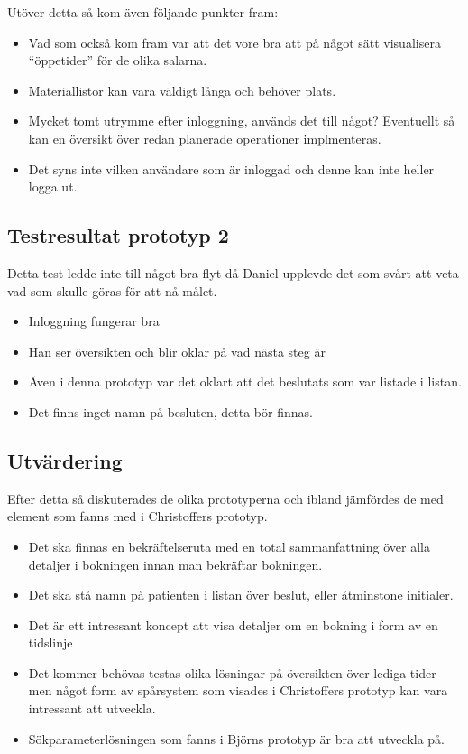 \documentclass[a4paper,10pt]{article}
\begin{document}
Utöver detta så kom även följande punkter fram:
\begin{itemize}
\item Vad som också kom fram var att det vore bra att på något sätt visualisera “öppetider” för de olika salarna.
\item Materiallistor kan vara väldigt långa och behöver plats.
\item Mycket tomt utrymme efter inloggning, används det till något? Eventuellt så kan en översikt över redan planerade operationer implmenteras.
\item Det syns inte vilken användare som är inloggad och denne kan inte heller logga ut.
\end{itemize}
\subsection{Testresultat prototyp 2}
Detta test ledde inte till något bra flyt då Daniel upplevde det som svårt att veta vad som skulle göras för att nå målet.
\begin{itemize}
\item Inloggning fungerar bra
\item Han ser översikten och blir oklar på vad nästa steg är
\item Även i denna prototyp var det oklart att det beslutats som var listade i listan.
\item Det finns inget namn på besluten, detta bör finnas.
\end{itemize}

\subsection{Utvärdering}
Efter detta så diskuterades de olika prototyperna och ibland jämfördes de med element som fanns med i Christoffers prototyp.

\begin{itemize}
\item Det ska finnas en bekräftelseruta med en total sammanfattning över alla detaljer i bokningen innan man bekräftar bokningen.
\item Det ska stå namn på patienten i listan över beslut, eller åtminstone initialer.
\item Det är ett intressant koncept att visa detaljer om en bokning i form av en tidslinje
\item Det kommer behövas testas olika lösningar på översikten över lediga tider men något form av spårsystem som visades i Christoffers prototyp kan vara intressant att utveckla.
\item Sökparameterlösningen som fanns i Björns prototyp är bra att utveckla på.
\end{itemize}
\end{document}

